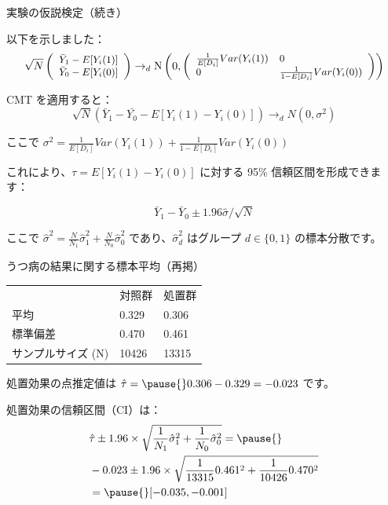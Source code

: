 \documentclass[11pt,handout]{beamer}
\newenvironment{wideitemize}{\itemize\addtolength{\itemsep}{10pt}}{\enditemize}
\begin{document}
\begin{frame}{実験の仮説検定（続き）}
\begin{wideitemize}
	\item
	以下を示しました：
		$$\small \sqrt{N} \left(   \begin{array}{c}  \bar{Y}_1 - E[Y_i(1)] \\ 
		\bar{Y}_0 - E[Y_i(0)] 
	\end{array}  \right) \rightarrow_d \mathrm{N}\left(0 , \left(\begin{array}{ll} \frac{1}{E[D_i]} Var(Y_i(1)) & 0 \\ 0 & \frac{1}{1-E[D_i]} Var(Y_i(0)) \end{array} \right) \right)$$

\pause
\item
CMT を適用すると：
$$\sqrt{N} (\bar{Y}_1 -  \bar{Y_0} - E[Y_i(1) - Y_i(0)]) \rightarrow_d N(0 , \sigma^2)$$ 

\noindent ここで $\sigma^2 = \frac{1}{E[D_i]} Var(Y_i(1)) + \frac{1}{1-E[D_i]} Var(Y_i(0)) $ 

\pause

\item
これにより、$\tau = E[Y_i(1) - Y_i(0)]$ に対する 95\% 信頼区間を形成できます：

$$\bar{Y}_1 - \bar{Y}_0 \pm  1.96 \hat\sigma / \sqrt{N}$$

\noindent ここで $\hat{\sigma}^2 = \frac{N}{N_1} \hat\sigma_1^2 + \frac{N}{N_0} \hat\sigma_0^2$ であり、$\hat{\sigma}^2_d$ はグループ $d\in\{0,1\}$ の標本分散です。
\end{wideitemize}	
\end{frame}

\begin{frame}{うつ病の結果に関する標本平均（再掲）}
	
	\begin{tabular}{lll}
		& 対照群 & 処置群 \\
		平均 & 0.329 & 0.306\\
		標準偏差 & 0.470 &  0.461 \\
		サンプルサイズ (N) & 10426 & 13315  
	\end{tabular}
	
	\pause
	\begin{wideitemize}
		\item
		処置効果の点推定値は $\hat\tau = \pause{} 0.306 - 0.329 = -0.023$ です。
		
		\pause
		\item
		処置効果の信頼区間（CI）は：
		\pause
		\begin{align*}
		&\hat\tau \pm 1.96 \times \sqrt{  \frac{1}{N_1}  \hat\sigma_1^2 + \frac{1}{N_0}  \hat\sigma_0^2  } = \pause{} \\ &-0.023 \pm 1.96 \times \sqrt{ \frac{1}{13315} 0.461^2 +  \frac{1}{10426} 0.470^2 } \\ &=  \pause{} [-0.035, -0.001] 
		\end{align*}
		
	\end{wideitemize}
	
\end{frame}
\end{document}
